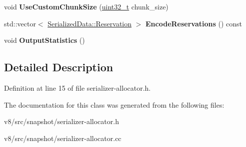 \begin{DoxyCompactItemize}
\mbox{\label{classv8_1_1internal_1_1SerializerAllocator_a97d88537919d60cbb5a15485f81e9a3e}} 
void {\bfseries Use\+Custom\+Chunk\+Size} (\mbox{\hyperlink{classuint32__t}{uint32\+\_\+t}} chunk\+\_\+size)
\item 
\mbox{\label{classv8_1_1internal_1_1SerializerAllocator_aec30375318f3dfc51f5d53046ef4e0cd}} 
std\+::vector$<$ \mbox{\hyperlink{classv8_1_1internal_1_1SerializedData_1_1Reservation}{Serialized\+Data\+::\+Reservation}} $>$ {\bfseries Encode\+Reservations} () const
\item 
\mbox{\label{classv8_1_1internal_1_1SerializerAllocator_aa6aab3a85fd11b5abaeebf8066193714}} 
void {\bfseries Output\+Statistics} ()
\end{DoxyCompactItemize}


\subsection{Detailed Description}


Definition at line 15 of file serializer-\/allocator.\+h.



The documentation for this class was generated from the following files\+:\begin{DoxyCompactItemize}
\item 
v8/src/snapshot/serializer-\/allocator.\+h\item 
v8/src/snapshot/serializer-\/allocator.\+cc\end{DoxyCompactItemize}

